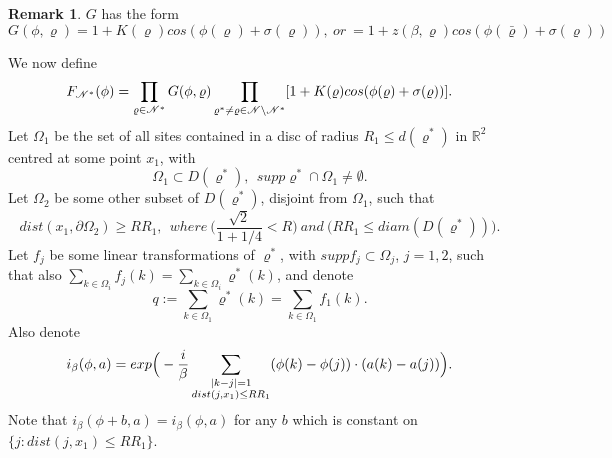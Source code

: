\documentclass[11pt,reqno]{article}
\DeclarePairedDelimiter\abs{\lvert}{\rvert}%
\theoremstyle{definition}
\newtheorem*{remark}{Remark}
\numberwithin{equation}{section}
\begin{document}
\begin{remark}
$G$ has the form 
$$G(\phi, \varrho) = 1+K(\varrho)cos(\phi(\varrho) + \sigma(\varrho)),\ or\ =1+z(\beta, \varrho)cos(\phi(\bar{\varrho}) + \sigma(\varrho))
$$
\end{remark}
We now define
$$
F_{\mathscr{N}^*}(\phi) = \prod_{\varrho \in \mathscr{N}^*} G(\phi, \varrho)
\prod_{\varrho^* \neq \varrho \in \mathscr{N} \setminus \mathscr{N}^*}[1+K(\varrho)cos(\phi(\varrho) + \sigma(\varrho))].
$$
Let $\Omega_1$ be the set of all sites contained in a disc of radius $R_1 \leq d(\varrho^*)$ in $\mathbb{R}^2$ centred at some point $x_1$, with
$$
\Omega_1 \subset D(\varrho^*), \ \ supp\varrho^* \cap \Omega_1 \neq \emptyset.
$$
Let $\Omega_2$ be some other subset of $D(\varrho^*)$, disjoint from $\Omega_1$, such that
$$
dist(x_1, \partial\Omega_2) \geq RR_1, \ \ where \ \Big(\frac{\sqrt{2}}{1+1/4} < R \Big) \ and\ \big(RR_1 \leq diam(D(\varrho^*))\big).
$$ 
Let $f_j$ be some linear transformations of $\varrho^*$, with $suppf_j \subset \Omega_j$, $j=1,2$, such that also $\sum_{k \in \Omega_i}f_j(k) = \sum_{k \in \Omega_i}\varrho^*(k)$, and denote
\begin{equation} \label{label:qdef}
q := \sum_{k \in \Omega_1}\varrho^*(k) = \sum_{k \in \Omega_1}f_1(k).
\end{equation}
Also denote 
$$
i_\beta(\phi, a) = exp\Big(-\frac{i}{\beta} \sum_{\substack{\abs{k-j}=1 \\ dist(j,x_1) \leq RR_1}} (\phi(k)-\phi(j)) \cdot (a(k)-a(j))\Big).
$$
Note that $i_\beta(\phi+b, a) = i_\beta(\phi, a)$ for any $b$ which is constant on $\{j: dist(j,x_1) \leq RR_1\} $.
\end{document}
